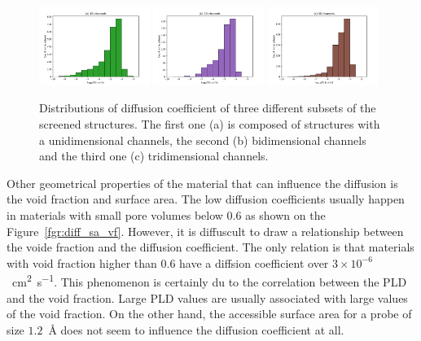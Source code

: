 \documentclass[main]{subfiles}
\begin{document}
\begin{figure}[ht]
  \centering
    \includegraphics[width=0.32\textwidth]{figures/5-diffusion/histogram_chan1D.pdf}
    \includegraphics[width=0.32\textwidth]{figures/5-diffusion/histogram_chan2D.pdf}
    \includegraphics[width=0.32\textwidth]{figures/5-diffusion/histogram_chan3D.pdf}
    \caption{ Distributions of diffusion coefficient of three different subsets of the screened structures. The first one (a) is composed of structures with a unidimensional channels, the second (b) bidimensional channels and the third one (c) tridimensional channels. }\label{fgr:hist_diffusion_chandim}
\end{figure}

Other geometrical properties of the material that can influence the diffusion is the void fraction and surface area. The low diffusion coefficients usually happen in materials with small pore volumes below $0.6$ as shown on the Figure~\ref{fgr:diff_sa_vf}. However, it is diffuscult to draw a relationship between the voide fraction and the diffusion coefficient. The only relation is that materials with void fraction higher than $0.6$ have a diffsion coefficient over $3\times 10^{-6}$~\si{\square\cm\per\s}. This phenomenon is certainly du to the correlation between the PLD and the void fraction. Large PLD values are usually associated with large values of the void fraction. On the other hand, the accessible surface area for a probe of size $1.2$~\si{\angstrom} does not seem to influence the diffusion coefficient at all. 
\end{document}
